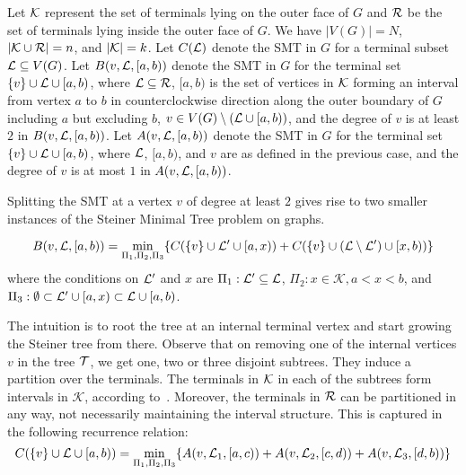 Let $\mathcal{K}$ represent the set of terminals lying on the outer face of $G$ and $\mathcal{R}$ be the set of terminals lying inside the outer face of $G$. We have $|V(G)|=N$, $|\mathcal{K} \cup \mathcal{R}|=n$, and $|\mathcal{K}|=k$. Let $C(\mathcal{L})$ denote the SMT in $G$ for a terminal subset $\mathcal{L} \subseteq V(G)$. Let $B(v,\mathcal{L},[a,b))$ denote the SMT in $G$ for the terminal set $\{v\} \cup \mathcal{L} \cup [a,b)$, where $\mathcal{L} \subseteq \mathcal{R}$, $[a,b)$ is the set of vertices in $\mathcal{K}$ forming an interval from vertex $a$ to $b$ in counterclockwise direction along the outer boundary of $G$ including $a$ but excluding $b$, $v \in V(G) \setminus (\mathcal{L} \cup [a,b))$, and the degree of $v$ is at least $2$ in $B(v,\mathcal{L},[a,b))$. Let $A(v,\mathcal{L},[a,b))$ denote the SMT in $G$ for the terminal set $\{v\} \cup \mathcal{L} \cup [a,b)$, where $\mathcal{L}$, $[a,b)$, and $v$ are as defined in the previous case, and the degree of $v$ is at most $1$ in $A(v,\mathcal{L},[a,b))$.

Splitting the SMT at a vertex $v$ of degree at least $2$ gives rise to two smaller instances of the {\sc Steiner Minimal Tree} problem on graphs.

\begin{equation}\label{eq:dw_B}
    B(v,\mathcal{L},[a,b)) = \min_{\Pi_1, \Pi_2, \Pi_3} \{C(\{v\} \cup \mathcal{L}' \cup [a,x)) + C(\{v\} \cup (\mathcal{L}\setminus \mathcal{L}') \cup [x,b)) \}
\end{equation} where the conditions on $\mathcal{L}'$ and $x$ are $\Pi_1: \mathcal{L}' \subseteq \mathcal{L}$, $\Pi_2: x \in \mathcal{K}, a< x <b$, and $\Pi_3: \emptyset \subset \mathcal{L}' \cup [a,x) \subset \mathcal{L} \cup [a,b)$.

The intuition is to root the tree at an internal terminal vertex and start growing the Steiner tree from there. Observe that on removing one of the internal vertices $v$ in the tree $\mathcal{T}$, we get one, two or three disjoint subtrees. They induce a partition over the terminals. The terminals in $\mathcal{K}$ in each of the subtrees form intervals in $\mathcal{K}$, according to~. Moreover, the terminals in $\mathcal{R}$ can be partitioned in any way, not necessarily maintaining the interval structure. This is captured in the following recurrence relation:
\begin{equation}\label{eq:dw_C}
    C(\{v\} \cup \mathcal{L} \cup [a,b)) = \min_{\Pi_1, \Pi_2, \Pi_3}\{A(v,\mathcal{L}_1,[a,c))+A(v,\mathcal{L}_2,[c,d))+A(v,\mathcal{L}_3,[d,b))\}
\end{equation}

